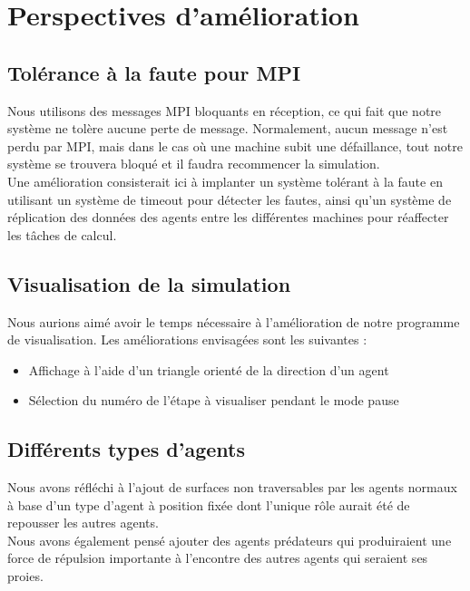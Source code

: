 \documentclass[12pt,a4paper,sans]{article}
\begin{document}
\section{Perspectives d'amélioration}

\subsection{Tolérance à la faute pour MPI}
Nous utilisons des messages MPI bloquants en réception, ce qui fait que notre système ne tolère aucune perte de message. Normalement, aucun message n'est perdu par MPI, mais dans le cas où une machine subit une défaillance, tout notre système se trouvera bloqué et il faudra recommencer la simulation.\\
Une amélioration consisterait ici à implanter un système tolérant à la faute en utilisant un système de timeout pour détecter les fautes, ainsi qu'un système de réplication des données des agents entre les différentes machines pour réaffecter les tâches de calcul.

\subsection{Visualisation de la simulation}
Nous aurions aimé avoir le temps nécessaire à l'amélioration de notre programme de visualisation. Les améliorations envisagées sont les suivantes :
\begin{itemize}
    \item Affichage à l'aide d'un triangle orienté de la direction d'un agent
    \item Sélection du numéro de l'étape à visualiser pendant le mode pause
\end{itemize}

\subsection{Différents types d'agents}
Nous avons réfléchi à l'ajout de surfaces non traversables par les agents normaux à base d'un type d'agent à position fixée dont l'unique rôle aurait été de repousser les autres agents.\\
Nous avons également pensé ajouter des agents prédateurs qui produiraient une force de répulsion importante à l'encontre des autres agents qui seraient ses proies.


\end{document}
